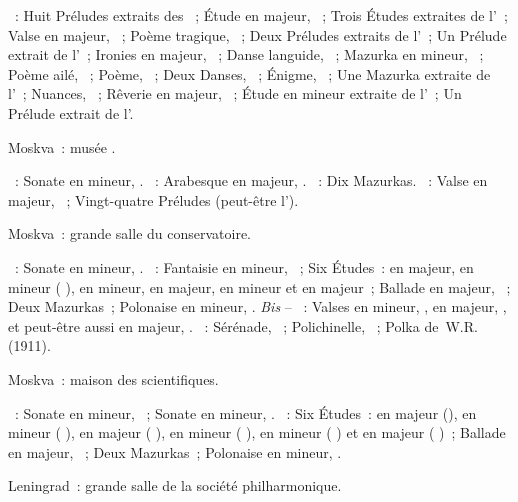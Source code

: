 \begin{description}
 \textsc{\Scriabine{}}~: Huit Préludes extraits des ~;
 Étude en \kB majeur,  ~; Trois Études extraites de
 l'~; Valse en \kA \Flat majeur, ~; Poème tragique,
 ~; Deux Préludes extraits de l'~; Un Prélude extrait de
 l'~; Ironies en \kC majeur,  ~; Danse languide,
  ~; Mazurka en \kE mineur,  ~; Poème
 ailé,  ~; Poème,  ~; Deux Danses,
 ~; Énigme,  ~; Une Mazurka extraite de
 l'~; Nuances,  ~; Rêverie en \kC majeur,
  ~; Étude en \kB \Flat mineur extraite de l'~;
 Un Prélude extrait de l'.
 \item[\DateWithWeekDay{1948-10-03}]
 Moskva~: musée \Scriabine{}.

 \textsc{\Beethoven{}}~: Sonate en \kC mineur, .
 \textsc{\Schumann{}}~: Arabesque en \kC majeur, .
 \textsc{\Chopin{}}~: Dix Mazurkas.
 \textsc{\Scriabine{}}~: Valse en \kA \Flat majeur, ~; Vingt-quatre
 Préludes (peut-être l').
 \item[\DateWithWeekDay{1948-10-12}]
 Moskva~: grande salle du conservatoire.

 \textsc{\Beethoven{}}~: Sonate en \kC mineur, .
 \textsc{\Chopin{}}~: Fantaisie en \kF mineur, ~; Six Études~: en
 \kC majeur, en \kE mineur ( ), en \kA mineur, en \kF
 majeur, en \kF mineur et en \kA \Flat majeur~; Ballade en \kA \Flat majeur,
 ~; Deux Mazurkas~; Polonaise en \kF \Sharp mineur, .
 \emph{Bis} -- \textsc{\Chopin{}}~: Valses  en \kC \Sharp mineur,
  ,  en \kA \Flat majeur,  ,
 et peut-être aussi  en \kD \Flat majeur,  .
 \textsc{\Rachmaninov{}}~: Sérénade,  ~; Polichinelle,
  ~; Polka de~W.R. (1911).
 \item[\DateWithWeekDay{1948-10-17}]
 Moskva~: maison des scientifiques.

 \textsc{\Beethoven{}}~: Sonate en \kC mineur, ~; Sonate en \kC
 mineur, .
 \textsc{\Chopin{}}~: Six Études~: en \kC majeur (), en \kA mineur
 ( ), en \kE majeur ( ), en \kE mineur
 ( ), en \kC \Sharp mineur ( ) et en
 \kA \Flat majeur ( )~; Ballade en \kA \Flat majeur,
 ~; Deux Mazurkas~; Polonaise en \kF \Sharp mineur, .
 \item[\DateWithWeekDay{1948-10-25}]
 Leningrad~: grande salle de la société philharmonique.


\end{description}
